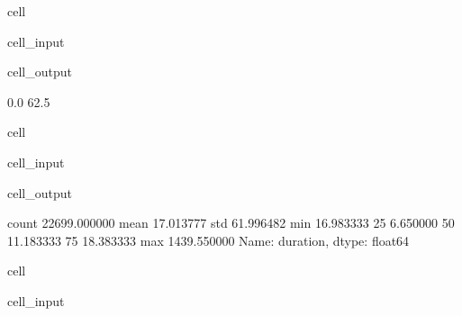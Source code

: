 \documentclass[letterpaper,10pt,english]{sphinxmanual}
\begin{document}
\begin{sphinxuseclass}{cell}
\begin{sphinxuseclass}{cell_input}
\begin{sphinxVerbatim}[commandchars=\\\{\}]
\PYG{p}{[}\PYG{p}{]}
\PYG{p}{[}\PYG{p}{]}
\end{sphinxVerbatim}

\end{sphinxuseclass}
\begin{sphinxuseclass}{cell_output}
\begin{sphinxVerbatim}[commandchars=\\\{\}]
0.0
62.5
\end{sphinxVerbatim}

\end{sphinxuseclass}
\end{sphinxuseclass}
\begin{sphinxuseclass}{cell}
\begin{sphinxuseclass}{cell_input}
\begin{sphinxVerbatim}[commandchars=\\\{\}]
\PYG{p}{[}\PYG{p}{]}
\end{sphinxVerbatim}

\end{sphinxuseclass}
\begin{sphinxuseclass}{cell_output}
\begin{sphinxVerbatim}[commandchars=\\\{\}]
count    22699.000000
mean        17.013777
std         61.996482
min        \PYGZhy{}16.983333
25\PYGZpc{}          6.650000
50\PYGZpc{}         11.183333
75\PYGZpc{}         18.383333
max       1439.550000
Name: duration, dtype: float64
\end{sphinxVerbatim}

\end{sphinxuseclass}
\end{sphinxuseclass}
\begin{sphinxuseclass}{cell}
\begin{sphinxuseclass}{cell_input}
\begin{sphinxVerbatim}[commandchars=\\\{\}]
\PYG{p}{[}\PYG{p}{[}\PYG{p}{]}    \PYG{p}{]}  
\end{sphinxVerbatim}

\end{sphinxuseclass}
\end{sphinxuseclass}
\end{document}
